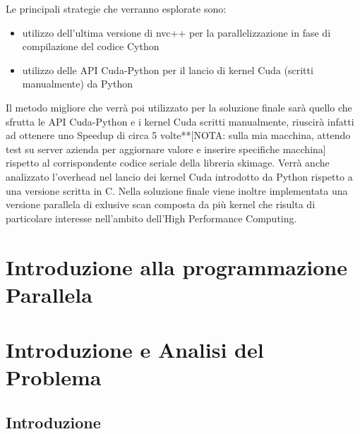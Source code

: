 \documentclass[12pt,a4paper]{report}
\begin{document}
Le principali strategie che verranno esplorate sono:
\begin{itemize}
\item utilizzo dell'ultima versione di nvc++ per la parallelizzazione in fase di compilazione del codice Cython
\item utilizzo delle API Cuda-Python per il lancio di kernel Cuda (scritti manualmente) da Python 
\end{itemize}
Il metodo migliore che verrà poi utilizzato per la soluzione finale sarà quello che sfrutta le API Cuda-Python e i kernel Cuda scritti manualmente, riuscirà infatti ad ottenere uno Speedup di circa 5 volte**[NOTA: sulla mia macchina,  attendo test su server azienda per aggiornare valore e inserire specifiche macchina] %
 rispetto al corrispondente codice seriale della libreria skimage. Verrà anche analizzato l'overhead nel lancio dei kernel Cuda introdotto da Python rispetto a una versione scritta in C. \newline
Nella soluzione finale viene inoltre implementata una versione parallela di exlusive scan composta da più kernel che risulta di particolare interesse nell'ambito dell'High Performance Computing.

\chapter{Introduzione alla programmazione Parallela}


\chapter{Introduzione e Analisi del Problema}
\section{Introduzione}
\end{document}
